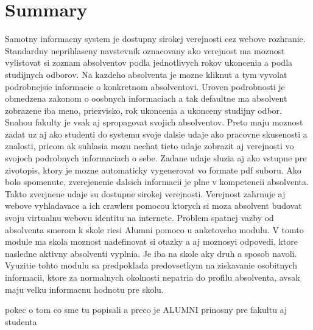 \documentclass{iitsrc}[2006/14/02]
\begin{document}
\section{Summary}

Samotny informacny system je dostupny sirokej verejnosti cez webove rozhranie. Standardny neprihlaseny navstevnik oznacovany ako verejnost ma moznost vylistovat si zoznam absolventov podla jednotlivych rokov ukoncenia a podla studijnych odborov. Na kazdeho absolventa je mozne kliknut a tym vyvolat podrobnejsie informacie o konkretnom absolventovi.  Uroven podrobnosti je obmedzena zakonom o oosbnych informaciach a tak defaultne ma absolvent zobrazene iba meno, priezvisko, rok ukoncenia a ukonceny studijny odbor. Snahou fakulty je vsak aj spropagovat svojich absolventov. Preto maju moznost zadat uz aj ako studenti do systemu svoje dalsie udaje ako pracovne skusenosti a znalosti, pricom ak suhlasia mozu nechat tieto udaje zobrazit aj verejnosti vo svojoch podrobnych informaciach o sebe. Zadane udaje sluzia aj ako vstupne pre zivotopis, ktory je mozne automaticky vygenerovat vo formate pdf suboru. Ako bolo spomenute, zverejenenie dalsich informacii je plne v kompetencii absolventa. Takto zverjnene udaje su dostupne sirokej verejnosti. Verejnost zahrnuje aj webove vyhladavace a ich crawlers pomocou ktorych si moza absolvent budovat svoju virtualnu webovu identitu na internete.
Problem spatnej vazby od absolventa smerom k skole riesi Alumni pomoco u anketoveho modulu. V tomto module ma skola moznost nadefinovat si otazky a aj moznosyi odpovedi, ktore nasledne aktivny absolventi vyplnia. Je iba na skole aky druh a sposob navoli. Vyuzitie tohto modulu sa predpoklada predovsetkym na ziskavanie osobitnych informacii, ktore za normalnych okolnosti nepatria do profilu absolventa, avsak maju velku informacnu hodnotu pre skolu. 

pokec o tom co sme tu popisali a preco je ALUMNI prinosny pre fakultu aj studenta 
  

\nocite{pcispec}
\nocite{ac97spec}
\nocite{ich4spec}
\nocite{crytalspec}
\nocite{osdesign}
\nocite{wdmdriver}
\nocite{alsadriver}
\nocite{pciwiki}



\end{document}
